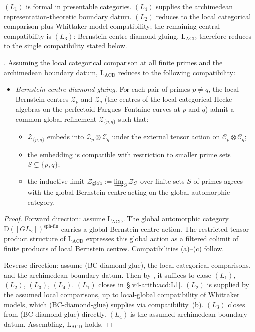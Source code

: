 \((L_{1})\) is formal in presentable categories.  \((L_{4})\) supplies
the archimedean representation-theoretic boundary datum.
\((L_{2})\) reduces to the local categorical comparison plus
Whittaker-model compatibility; the remaining central compatibility is
\((L_{3})\): Bernstein-centre diamond gluing.
\(\mathrm{L}_{\mathrm{ACD}}\) therefore reduces to the single
compatibility stated below.

\begin{theorem}
\label{v4-arith:acd:thm:final-reduction}
\ClaimStatusProvedHereConditional. Assuming the local categorical
comparison at all finite primes and the archimedean boundary datum,
\(\mathrm{L}_{\mathrm{ACD}}\) reduces to the following compatibility:
\begin{itemize}
\item[\textbf{(BC-diamond-glue)}] \emph{Bernstein-centre diamond
gluing.} For each pair of primes \(p\neq q\), the local Bernstein
centres \(\mathcal{Z}_{p}\) and \(\mathcal{Z}_{q}\) (the centres of the
local categorical Hecke algebras on the perfectoid Fargues--Fontaine
curves at \(p\) and \(q\)) admit a common global refinement
\(\mathcal{Z}_{\{p,q\}}\) such that:
\begin{itemize}
\item[(a)] \(\mathcal{Z}_{\{p,q\}}\) embeds into
\(\mathcal{Z}_{p}\otimes\mathcal{Z}_{q}\) under the external tensor
action on \(\mathcal{C}_{p}\otimes\mathcal{C}_{q}\);
\item[(b)] the embedding is compatible with restriction to smaller
prime sets \(S\subsetneq\{p,q\}\);
\item[(c)] the inductive limit
\(\mathcal{Z}_{\mathrm{glob}}:=\varinjlim_{S}\mathcal{Z}_{S}\) over
finite sets \(S\) of primes agrees with the global Bernstein centre
acting on the global automorphic category.
\end{itemize}
\end{itemize}
\end{theorem}

\begin{proof}
Forward direction: assume \(\mathrm{L}_{\mathrm{ACD}}\). The global
automorphic category \(\mathrm{D}([GL_{2}])^{\mathrm{sph\text{-}fin}}\)
carries a global Bernstein-centre action. The restricted tensor
product structure of \(\mathrm{L}_{\mathrm{ACD}}\) expresses this
global action as a filtered colimit of finite products of local
Bernstein centres. Compatibilities (a)--(c) follow.

Reverse direction: assume (BC-diamond-glue), the local categorical
comparisons, and the archimedean boundary datum. Then by
, it suffices to close
\((L_{1})\), \((L_{2})\), \((L_{3})\), \((L_{4})\). \((L_{1})\) closes
in~\S\ref{v4-arith:acd:L1}. \((L_{2})\) is supplied
by the assumed local comparisons, up to local-global compatibility of
Whittaker models, which (BC-diamond-glue) supplies via
compatibility~(b). \((L_{3})\) closes from (BC-diamond-glue) directly.
\((L_{4})\) is the assumed archimedean boundary datum. Assembling,
\(\mathrm{L}_{\mathrm{ACD}}\) holds.
\end{proof}


